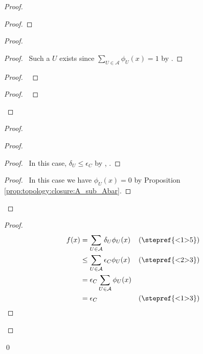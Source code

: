 \begin{proof}
\begin{proof}
  \end{proof}
  \begin{proof}
    \begin{proof}
      \pf\ Such a $U$ exists since $\sum_{U \in \mathcal{A}} \phi_U(x) = 1$ by .
    \end{proof}
    \begin{proof}
      \pf\ 
    \end{proof}
    \qedstep
    \begin{proof}
      \pf\ 
    \end{proof}
  \end{proof}
  \begin{proof}
    \begin{proof}
      \begin{proof}
        \pf\ In this case, $\delta_U \leq \epsilon_C$ by , .
      \end{proof}
      \begin{proof}
        \pf\ In this case we have $\phi_U(x) = 0$ by Proposition \ref{prop:topology:closure:A_sub_Abar}.
      \end{proof}
    \end{proof}
    \begin{proof}
      \pf
      \begin{align*}
        f(x) & = \sum_{U \in \mathcal{A}} \delta_U \phi_U(x) & (\text{\stepref{<1>5}})\\
        & \leq \sum_{U \in \mathcal{A}} \epsilon_C \phi_U(x) & (\text{\stepref{<2>3}})\\
        & = \epsilon_C \sum_{U \in \mathcal{A}} \phi_U(x) \\
        & = \epsilon_C & (\text{\stepref{<1>3}})
      \end{align*}
    \end{proof}
  \end{proof}
  \qed
\end{proof}

